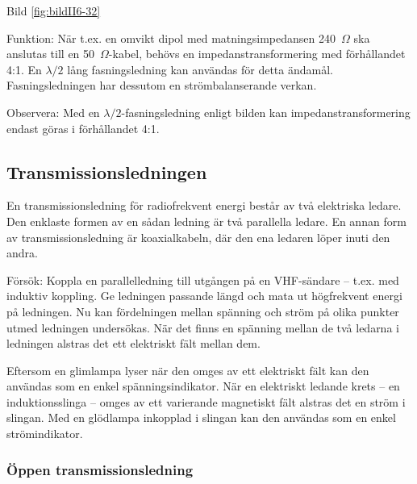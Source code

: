 Bild \ref{fig:bildII6-32}

Funktion: När t.ex. en omvikt dipol med matningsimpedansen 240~\(\Omega\) ska
anslutas till en 50~\(\Omega\)-kabel, behövs en impedanstransformering med
förhållandet 4:1. En \(\lambda/2\) lång fasningsledning kan användas för detta
ändamål. Fasningsledningen har dessutom en strömbalanserande verkan.

Observera: Med en \(\lambda/2\)-fasningsledning enligt bilden kan
impedanstransformering endast göras i förhållandet 4:1.

\subsection{Transmissionsledningen}

En transmissionsledning för radiofrekvent energi består av två
elektriska ledare.  Den enklaste formen av en sådan ledning är
två parallella ledare. En annan form av transmissionsledning är
koaxialkabeln, där den ena ledaren löper inuti den andra.

Försök: Koppla en parallelledning till utgången på en VHF-sändare --
t.ex. med induktiv koppling. Ge ledningen passande längd och mata ut
högfrekvent energi på ledningen. Nu kan fördelningen mellan spänning
och ström på olika punkter utmed ledningen undersökas. När det finns
en spänning mellan de två ledarna i ledningen alstras det ett
elektriskt fält mellan dem.

Eftersom en glimlampa lyser när den omges av ett elektriskt fält kan
den användas som en enkel spänningsindikator.  När en elektriskt
ledande krets -- en induktionsslinga -- omges av ett varierande
magnetiskt fält alstras det en ström i slingan.  Med en glödlampa
inkopplad i slingan kan den användas som en enkel strömindikator.

\subsubsection{Öppen transmissionsledning}

